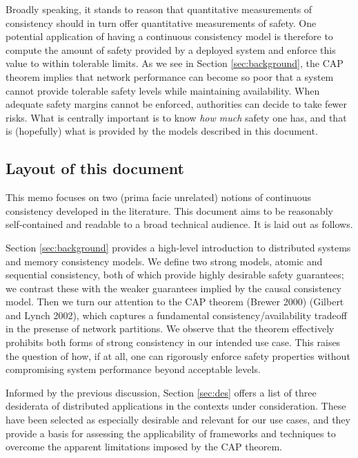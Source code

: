 \documentclass[]             %
{NASA}                       %
\theoremstyle{definition}
\begin{document}
Broadly speaking, it stands to reason that quantitative measurements of
consistency should in turn offer quantitative measurements of safety.
One potential application of having a continuous consistency model is
therefore to compute the amount of safety provided by a deployed system
and enforce this value to within tolerable limits. As we see in Section
\ref{sec:background}, the CAP theorem implies that network performance
can become so poor that a system cannot provide tolerable safety levels
while maintaining availability. When adequate safety margins cannot be
enforced, authorities can decide to take fewer risks. What is centrally
important is to know \emph{how much} safety one has, and that is
(hopefully) what is provided by the models described in this document.

\hypertarget{layout-of-this-document}{%
\subsection{Layout of this document}\label{layout-of-this-document}}

This memo focuses on two (prima facie unrelated) notions of continuous
consistency developed in the literature. This document aims to be
reasonably self-contained and readable to a broad technical audience. It
is laid out as follows.

Section \ref{sec:background} provides a high-level introduction to
distributed systems and memory consistency models. We define two strong
models, atomic and sequential consistency, both of which provide highly
desirable safety guarantees; we contrast these with the weaker
guarantees implied by the causal consistency model. Then we turn our
attention to the CAP theorem (Brewer 2000) (Gilbert and Lynch 2002),
which captures a fundamental consistency/availability tradeoff in the
presense of network partitions. We observe that the theorem effectively
prohibits both forms of strong consistency in our intended use case.
This raises the question of how, if at all, one can rigorously enforce
safety properties without compromising system performance beyond
acceptable levels.

Informed by the previous discussion, Section \ref{sec:des} offers a list
of three desiderata of distributed applications in the contexts under
consideration. These have been selected as especially desirable and
relevant for our use cases, and they provide a basis for assessing the
applicability of frameworks and techniques to overcome the apparent
limitations imposed by the CAP theorem.
\end{document}
